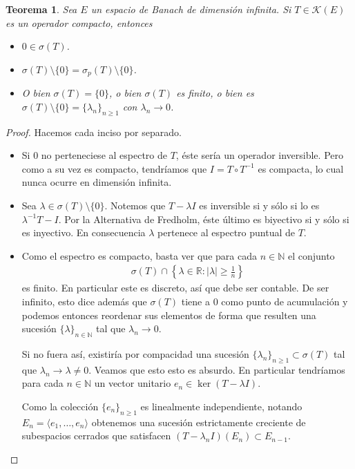 \documentclass[11pt]{report}
\theoremstyle{colored}
\newtheorem{theorem}{Teorema}[section]
\newcommand{\N}{\mathbb{N}}
\newcommand{\R}{\mathbb{R}}
\begin{document}
\begin{theorem} Sea $E$ un espacio de Banach de dimensión infinita. Si $T \in \mathscr{K}(E)$ es un operador compacto, entonces
\begin{itemize}
\item[(i)] $0 \in \sigma(T)$.
\item[(ii)] $\sigma(T) \setminus \{0\} = \sigma_p(T) \setminus \{0\}$.
\item[(iii)] O bien $\sigma(T) = \{0\}$, o bien $\sigma(T)$ es finito, o bien es $\sigma(T) \setminus \{0\} = \{\lambda_n\}_{n \geq 1}$ con $\lambda_n \to 0$.
\end{itemize} 
\end{theorem}
\begin{proof} Hacemos cada inciso por separado.
\begin{itemize}[listparindent = \parindent]
\item[(i)] Si $0$ no perteneciese al espectro de $T$, éste sería un operador inversible. Pero como a su vez es compacto, tendríamos que $I = T \circ T^{-1}$ es compacta, lo cual nunca ocurre en dimensión infinita.
\item[(ii)] Sea $\lambda \in \sigma(T) \setminus \{0\}$. Notemos que $T-\lambda I$ es inversible si y sólo si lo es $\lambda^{-1}T-I$. Por la Alternativa de Fredholm, éste último es biyectivo si y sólo si es inyectivo. En consecuencia $\lambda$ pertenece al espectro puntual de $T$.
\item[(iii)] Como el espectro es compacto, basta ver que para cada $n \in \N$  el conjunto
\begin{align*}
\sigma(T) \cap \left\{\lambda \in \R : |\lambda| \geq \frac{1}{n}\right\}
\end{align*}
es finito. En particular este es discreto, así que debe ser contable. De ser infinito, esto dice además que $\sigma(T)$ tiene a $0$ como punto de acumulación y podemos entonces reordenar sus elementos de forma que resulten una sucesión $\{\lambda\}_{n \in \N}$ tal que $\lambda_n \to 0$.

Si no fuera así, existiría por compacidad una sucesión $\{\lambda_n\}_{n \geq 1} \subset \sigma(T)$ tal que $\lambda_n \to \lambda \neq 0$. Veamos que esto esto es absurdo. En particular tendríamos para cada $n \in \N$ un vector unitario $e_n \in \ker (T-\lambda I)$. 

Como la colección $\{e_n\}_{n \geq 1}$ es linealmente independiente,  notando $E_n = \langle e_1, \dots, e_n \rangle$ obtenemos una sucesión estrictamente creciente de subespacios cerrados que satisfacen $(T-\lambda_nI)(E_n) \subset E_{n-1}$.


\end{itemize}
\end{proof}
\end{document}
